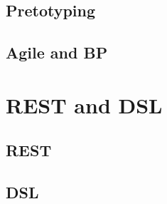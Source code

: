 \documentclass[10pt,unicode,serif,compress,slidetop]{beamer}
\begin{document}
\subsection{Pretotyping}

\subsection{Agile and BP}


\section{REST and DSL}
\subsection{REST}

\subsection{DSL}



% 
\end{document}
